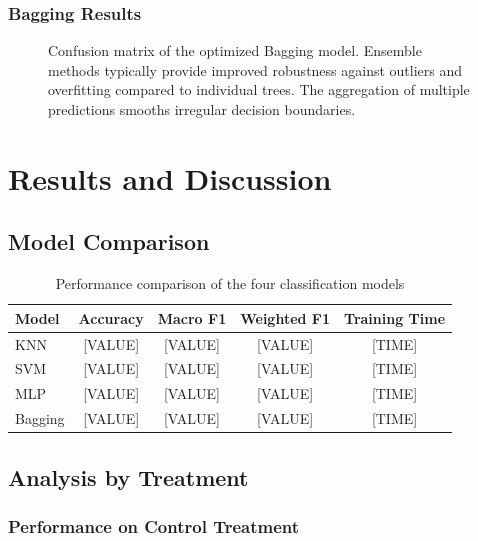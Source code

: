 \documentclass[12pt,a4paper]{article}
\begin{document}
\subsubsection{Bagging Results}

\begin{figure}[H]
    \centering
    \caption{Confusion matrix of the optimized Bagging model. Ensemble methods typically provide improved robustness against outliers and overfitting compared to individual trees. The aggregation of multiple predictions smooths irregular decision boundaries.}
    \label{fig:bagging_confusion}
\end{figure}

\newpage
\section{Results and Discussion}
\label{sec:results}

\subsection{Model Comparison}

\begin{table}[H]
\centering
\caption{Performance comparison of the four classification models}
\label{tab:model_comparison}
\begin{tabular}{lcccc}
\toprule
\textbf{Model} & \textbf{Accuracy} & \textbf{Macro F1} & \textbf{Weighted F1} & \textbf{Training Time} \\
\midrule
KNN & [VALUE] & [VALUE] & [VALUE] & [TIME] \\
SVM & [VALUE] & [VALUE] & [VALUE] & [TIME] \\
MLP & [VALUE] & [VALUE] & [VALUE] & [TIME] \\
Bagging & [VALUE] & [VALUE] & [VALUE] & [TIME] \\
\bottomrule
\end{tabular}
\end{table}

\subsection{Analysis by Treatment}

\subsubsection{Performance on Control Treatment}
\end{document}
